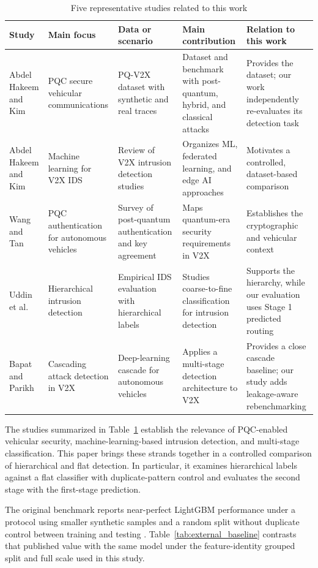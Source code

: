 \documentclass{IEEEoj}
\begin{document}
\begin{table}[!t]
\caption{Five representative studies related to this work}
\label{tab:related_work}
\centering
\small
\begin{tabularx}{\textwidth}{p{} p{} p{} X p{}}
\toprule
Study & Main focus & Data or scenario & Main contribution & Relation to this work \\
\midrule
Abdel Hakeem and Kim \cite{105018710169} & PQC secure vehicular communications & PQ-V2X dataset with synthetic and real traces & Dataset and benchmark with post-quantum, hybrid, and classical attacks & Provides the dataset; our work independently re-evaluates its detection task \\
Abdel Hakeem and Kim \cite{105006773029} & Machine learning for V2X IDS & Review of V2X intrusion detection studies & Organizes ML, federated learning, and edge AI approaches & Motivates a controlled, dataset-based comparison \\
Wang and Tan \cite{105042709447} & PQC authentication for autonomous vehicles & Survey of post-quantum authentication and key agreement & Maps quantum-era security requirements in V2X & Establishes the cryptographic and vehicular context \\
Uddin et al. \cite{S1570870525002306} & Hierarchical intrusion detection & Empirical IDS evaluation with hierarchical labels & Studies coarse-to-fine classification for intrusion detection & Supports the hierarchy, while our evaluation uses Stage 1 predicted routing \\
Bapat and Parikh \cite{105045590822} & Cascading attack detection in V2X & Deep-learning cascade for autonomous vehicles & Applies a multi-stage detection architecture to V2X & Provides a close cascade baseline; our study adds leakage-aware rebenchmarking \\
\bottomrule
\end{tabularx}
\end{table}

The studies summarized in Table~\ref{tab:related_work} establish the relevance
of PQC-enabled vehicular security, machine-learning-based intrusion detection,
and multi-stage classification. This paper brings these strands together in a
controlled comparison of hierarchical and flat detection. In particular, it
examines hierarchical labels against a flat classifier with duplicate-pattern
control and evaluates the second stage with the first-stage prediction.

The original benchmark reports near-perfect LightGBM performance under a
protocol using smaller synthetic samples and a random split without duplicate
control between training and testing \cite{105018710169}. Table~\ref{tab:external_baseline}
contrasts that published value with the same model under the feature-identity
grouped split and full scale used in this study.
\end{document}
